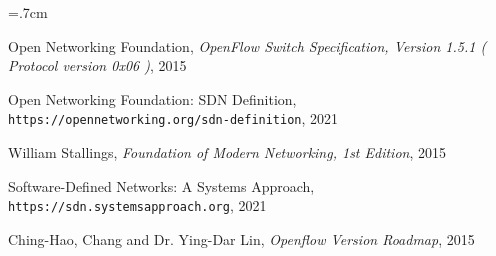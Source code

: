\renewcommand{\bibname}{مراجع}

\begin{thebibliography}{99}

\begin{latin}

\baselineskip=.7cm

\noindent Open Networking Foundation, \textit{OpenFlow Switch Specification, Version 1.5.1 ( Protocol version 0x06 )}, 2015

\noindent Open Networking Foundation: SDN Definition, \\\texttt{https://opennetworking.org/sdn-definition}, 2021

\noindent William Stallings, \textit{Foundation of Modern Networking, 1st Edition}, 2015

\noindent Software-Defined Networks: A Systems Approach,  \\\texttt{https://sdn.systemsapproach.org}, 2021

\noindent Ching-Hao, Chang and Dr. Ying-Dar Lin, \textit{Openflow Version Roadmap}, 2015
\end{latin}

\end{thebibliography}